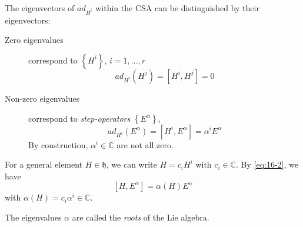 %
The eigenvectors of $ad_{H^{i}}$ within the CSA can be distinguished by their eigenvectors:
\begin{description}
  \item[Zero eigenvalues] correspond to $\left\{ H^{i} \right\}$, $i = 1, \dots, r$
    \begin{equation}
      ad_{H^{i}}(H^{j}) = [H^{i}, H^{j}] = 0
    \end{equation}
  \item[Non-zero eigenvalues] correspond to \emph{step-operators} $\left\{ E^{\alpha} \right\}$,
    \begin{equation}
      \label{eq:16-2}
      ad_{H^{i}}(E^{\alpha}) = [H^{i}, E^{\alpha}] = \alpha^{i} E^{\alpha}
    \end{equation}
    By construction, $\alpha^{i} \in \mathbb{C}$ are not all zero.
\end{description}

For a general element $H \in \mathfrak{h}$, we can write $H = c_{i} H^{i}$ with $c_{i} \in \mathbb{C}$.
By \eqref{eq:16-2}, we have
\begin{equation}
  \label{eq:16-3}
  [H, E^{\alpha}] = \alpha(H) E^{\alpha}
\end{equation}
with $\alpha(H) = c_{i} \alpha^{i} \in \mathbb{C}$.

\begin{definition}[]
  \label{def:roots}
  The eigenvalues $\alpha$ are called the \emph{roots} of the Lie algebra. 
\end{definition}

